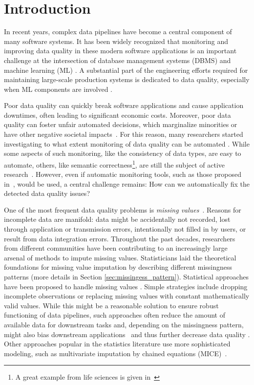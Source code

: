 \documentclass[utf8]{frontiersSCNS} %
\begin{document}
\section{Introduction}
\label{sec:introduction}

In recent years, complex data pipelines have become a central component of many software systems. It has been widely recognized that monitoring and improving data quality in these modern software applications is an important challenge at the intersection of database management systems (DBMS) and machine learning (ML) \citep{Schelter2015,Abedjan2018}. A substantial part of the engineering efforts required for maintaining large-scale production systems is dedicated to data quality, especially when ML components are involved \citep{Sculley2015,Bose2017b}.

Poor data quality can quickly break software applications and cause application downtimes, often leading to significant economic costs. Moreover, poor data quality can foster unfair automated decisions, which marginalize minorities or have other negative societal impacts~\citep{Stoyanovich2020,Yang2020,Bender2021}. For this reason, many researchers started investigating to what extent monitoring of data quality can be automated \citep{Abedjan2016,Baylor2017,Schelter2018,rukat2020towards}. While some aspects of such monitoring, like the consistency of data types, are easy to automate, others, like semantic correctness\footnote{A great example from life sciences is given in~\citep{Ziemann2016}}, are still the subject of active research~\citep{biessmann2021automated}. However, even if automatic monitoring tools, such as those proposed in~\cite{Schelter2017}, would be used, a central challenge remains: How can we automatically fix the detected data quality issues?

One of the most frequent data quality problems is \emph{missing values}~\citep{Kumar}. Reasons for incomplete data are manifold: data might be accidentally not recorded, lost through application or transmission errors, intentionally not filled in by users, or result from data integration errors.
%
Throughout the past decades, researchers from different communities have been contributing to an increasingly large arsenal of methods to impute missing values. Statisticians laid the theoretical foundations for missing value imputation \citep{Rubin} by describing different missingness patterns (more details in Section \ref{sec:missingess_pattern}). Statistical approaches have been proposed to handle missing values \citep{Graham}. Simple strategies include dropping incomplete observations or replacing missing values with constant mathematically valid values. While this might be a reasonable solution to ensure robust functioning of data pipelines, such approaches often reduce the amount of available data for downstream tasks and, depending on the missingness pattern, might also bias downstream applications~\citep{Stoyanovich2020,Yang2020} and thus further decrease data quality \citep{Little, Graham}. Other approaches popular in the statistics literature use more sophisticated modeling, such as multivariate imputation by chained equations (MICE)~\citep{Little,vanBuuren2018}.
\end{document}
